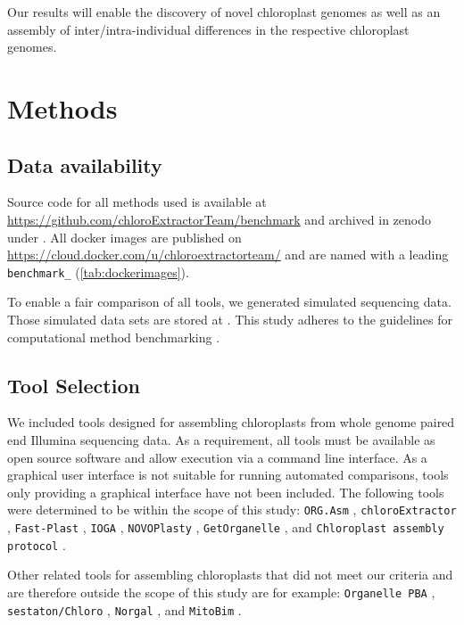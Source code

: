 \documentclass{bmcart}
\newcommand{\formatprogramnames}[1]{\texttt{#1}}
\newcommand{\ce}{\formatprogramnames{chloroExtractor}}
\newcommand{\oa}{\formatprogramnames{ORG.Asm}}
\newcommand{\fp}{\formatprogramnames{Fast-Plast}}
\newcommand{\ioga}{\formatprogramnames{IOGA}}
\newcommand{\np}{\formatprogramnames{NOVOPlasty}}
\newcommand{\go}{\formatprogramnames{GetOrganelle}}
\newcommand{\cassp}{\formatprogramnames{Chloroplast assembly protocol}}
\newcommand{\zenododataset}{\cite{zenododataset}}
\newcommand{\zenodorepo}{\cite{zenodorepo}}
\begin{document}
Our results will enable the discovery of novel chloroplast genomes as well as an assembly of inter/intra-individual differences in the respective chloroplast genomes.  

\section*{Methods}
\subsection*{Data availability}
Source code for all methods used is available at \url{https://github.com/chloroExtractorTeam/benchmark} and archived in zenodo under \zenodorepo{}.
All docker images are published on \url{https://cloud.docker.com/u/chloroextractorteam/} and are named with a leading \texttt{benchmark\_} (\cref{tab:dockerimages}).

To enable a fair comparison of all tools, we generated simulated sequencing data.
Those simulated data sets are stored at \zenododataset{}.
This study adheres to the guidelines for computational method benchmarking \cite{weber_essential_2018}.

\subsection*{Tool Selection}
We included tools designed for assembling chloroplasts from whole genome paired end Illumina sequencing data. As a requirement, all tools must be available as open source software and allow execution via a command line interface. As a graphical user interface is not suitable for
running automated comparisons, tools only providing a graphical interface have not been included. The following tools were determined to be within the scope of this study:
\oa{} \cite{coissac_barcodes_2016}, 
\ce{} \cite{j_ankenbrand_chloroextractor:_2018}, 
\fp{} \cite{mckain__fast-plast_2017}, 
\ioga{} \cite{bakker_herbarium_2016}, 
\np{} \cite{dierckxsens_novoplasty:_2017}, 
\go{} \cite{jin_getorganelle:_2018}, and
\cassp{} \cite{sancho_comparative_2018}.

Other related tools for assembling chloroplasts that did not meet our criteria and are therefore outside the scope of this study are for example:
\texttt{Organelle PBA} \cite{Soorni2017}, \texttt{sestaton/Chloro} \cite{sestaton}, \texttt{Norgal}  \cite{Al-Nakeeb2017}, and \texttt{MitoBim} \cite{mitobim2013}.
\end{document}
